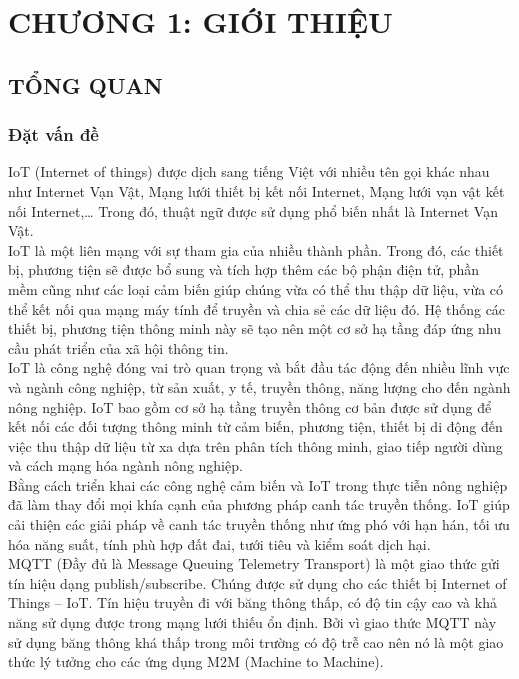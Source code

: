 \section*{CHƯƠNG 1: GIỚI THIỆU}
\setcounter{section}{1}
\subsection{TỔNG QUAN}
\subsubsection{Đặt vấn đề}
IoT (Internet of things) được dịch sang tiếng Việt với nhiều tên gọi khác nhau như Internet Vạn Vật, Mạng lưới thiết bị kết nối Internet, Mạng lưới vạn vật kết nối Internet,… Trong đó, thuật ngữ được sử dụng phổ biến nhất là Internet Vạn Vật.\\
\indent IoT là một liên mạng với sự tham gia của nhiều thành phần. Trong đó, các thiết bị, phương tiện sẽ được bổ sung và tích hợp thêm các bộ phận điện tử, phần mềm cũng như các loại cảm biến giúp chúng vừa có thể thu thập dữ liệu, vừa có thể kết nối qua mạng máy tính để truyền và chia sẻ các dữ liệu đó. Hệ thống các thiết bị, phương tiện thông minh này sẽ tạo nên một cơ sở hạ tầng đáp ứng nhu cầu phát triển của xã hội thông tin.\\
\indent IoT là công nghệ đóng vai trò quan trọng và bắt đầu tác động đến nhiều lĩnh vực và ngành công nghiệp, từ sản xuất, y tế, truyền thông, năng lượng cho đến ngành nông nghiệp. IoT bao gồm cơ sở hạ tầng truyền thông cơ bản được sử dụng để kết nối các đối tượng thông minh từ cảm biến, phương tiện, thiết bị di động đến việc thu thập dữ liệu từ xa dựa trên phân tích thông minh, giao tiếp người dùng và cách mạng hóa ngành nông nghiệp.\\
\indent Bằng cách triển khai các công nghệ cảm biến và IoT trong thực tiễn nông nghiệp đã làm thay đổi mọi khía cạnh của phương pháp canh tác truyền thống. IoT giúp cải thiện các giải pháp về canh tác truyền thống như ứng phó với hạn hán, tối ưu hóa năng suất, tính phù hợp đất đai, tưới tiêu và kiểm soát dịch hại.\\
\indent MQTT (Đầy đủ là Message Queuing Telemetry Transport) là một giao thức gửi tín hiệu dạng publish/subscribe. Chúng được sử dụng cho các thiết bị Internet of Things – IoT. Tín hiệu truyền đi với băng thông thấp, có độ tin cậy cao và khả năng sử dụng được trong mạng lưới thiếu ổn định. Bởi vì giao thức MQTT này sử dụng băng thông khá thấp trong môi trường có độ trễ cao nên nó là một giao thức lý tưởng cho các ứng dụng M2M (Machine to Machine).\\
